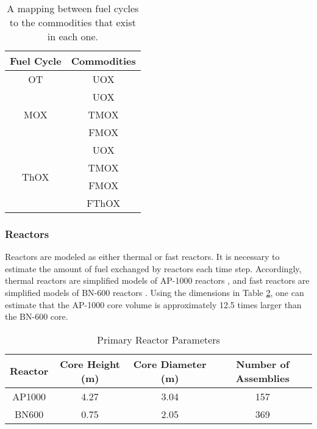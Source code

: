 \begin{table}[h!]
\centering
\caption{A mapping between fuel cycles to the commodities that exist in each one.}
\label{tbl:fc_to_commods}
\begin{tabular}{|c|c|}
\hline
\textbf{Fuel Cycle}            & \textbf{Commodities} \\ \hline
OT                    & UOX         \\ \hline
\multirow{3}{*}{MOX}  & UOX         \\  
                      & TMOX        \\  
                      & FMOX        \\ \hline
\multirow{4}{*}{ThOX} & UOX         \\  
                      & TMOX        \\  
                      & FMOX        \\  
                      & FThOX       \\ \hline
\end{tabular}
\end{table}

\subsubsection{Reactors}

Reactors are modeled as either thermal or fast reactors. It is necessary to
estimate the amount of fuel exchanged by reactors each time step. Accordingly,
thermal reactors are simplified models of AP-1000 reactors \cite{ARIS}, and fast
reactors are simplified models of BN-600 reactors
\cite{reactors2007experience}. Using the dimensions in Table
\ref{tbl:rx_params}, one can estimate that the AP-1000 core volume is
approximately 12.5 times larger than the BN-600 core.

\begin{table}[h!]
\centering
\caption{Primary Reactor Parameters}
\label{tbl:rx_params}
\begin{tabular}{|c|c|c|c|}
\hline
\textbf{Reactor} & \textbf{Core Height (m)} & \textbf{Core Diameter (m)}
& \textbf{Number of Assemblies} \\ \hline
AP1000  & 4.27            & 3.04              & 157 \\ \hline
BN600   & 0.75            & 2.05              & 369 \\ \hline
\end{tabular}
\end{table}

